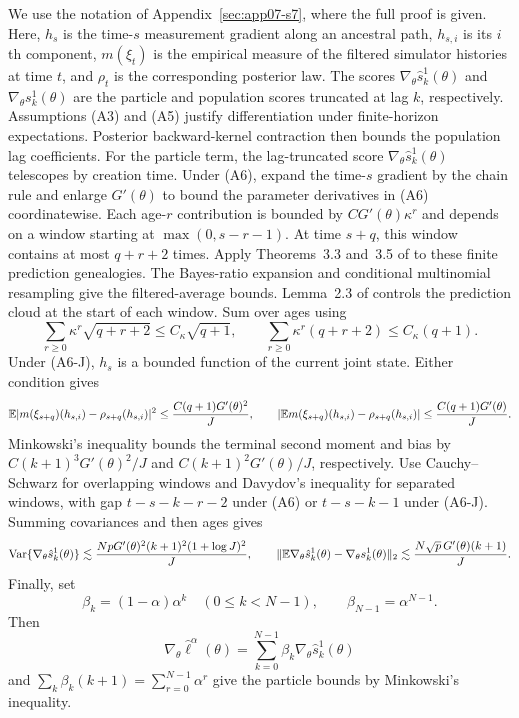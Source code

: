 \begingroup
We use the notation of Appendix~\ref{sec:app07-s7}, where the full proof is given.
Here, $h_s$ is the time-$s$ measurement
gradient along an ancestral path, $h_{s,i}$ is its $i$th component,
$m(\xi_t)$ is the empirical measure of the filtered simulator histories
at time $t$, and $\rho_t$ is the corresponding posterior law.
The scores $\nabla_\theta\hat s_k^1(\theta)$ and
$\nabla_\theta s_k^1(\theta)$ are the particle and population scores
truncated at lag $k$, respectively.
Assumptions (A3) and (A5) justify differentiation under finite-horizon
expectations. Posterior backward-kernel contraction then bounds the
population lag coefficients.
For the particle term, the lag-truncated score
$\nabla_\theta\hat s_k^1(\theta)$ telescopes by creation time.
Under (A6), expand the time-$s$ gradient by the chain rule and enlarge
$G'(\theta)$ to bound the parameter derivatives in (A6) coordinatewise.
Each age-$r$ contribution is bounded by $CG'(\theta)\kappa^r$ and depends
on a window starting at $\max(0,s-r-1)$. At time $s+q$, this window
contains at most $q+r+2$ times. Apply Theorems~3.3 and~3.5 of
\citet{chanDelMoral18} to these finite prediction genealogies.
The Bayes-ratio expansion and conditional multinomial resampling give the
filtered-average bounds. Lemma~2.3 of \citet{karjalainen23} controls the
prediction cloud at the start of each window. Sum over ages using
\[
\sum_{r\geq0}\kappa^r\sqrt{q+r+2}\leq C_\kappa\sqrt{q+1},
\qquad
\sum_{r\geq0}\kappa^r(q+r+2)\leq C_\kappa(q+1).
\]
Under (A6-J), $h_s$ is a bounded function of the current joint state.
Either condition gives
\[
\mathbb{E}|m(\xi_{s+q})(h_{s,i})-\rho_{s+q}(h_{s,i})|^2
\leq \frac{C(q+1)G'(\theta)^2}{J},
\qquad
|\mathbb{E} m(\xi_{s+q})(h_{s,i})-\rho_{s+q}(h_{s,i})|
\leq \frac{C(q+1)G'(\theta)}{J}.
\]
Minkowski's inequality bounds the terminal second moment and bias by
$C(k+1)^3G'(\theta)^2/J$ and $C(k+1)^2G'(\theta)/J$,
respectively. Use Cauchy--Schwarz for overlapping windows and Davydov's
inequality for separated windows, with gap $t-s-k-r-2$ under (A6) or
$t-s-k-1$ under (A6-J). Summing covariances and then ages gives
\[
\mathrm{Var}\{\nabla_\theta\hat s_k^1(\theta)\}
\lesssim\frac{NpG'(\theta)^2(k+1)^2(1+\log J)^2}{J},
\qquad
\|\mathbb{E}\nabla_\theta\hat s_k^1(\theta)
-\nabla_\theta s_k^1(\theta)\|_2
\lesssim\frac{N\sqrt p\,G'(\theta)(k+1)}{J}.
\]
Finally, set
\[
\beta_k=(1-\alpha)\alpha^k\quad(0\leq k<N-1),
\qquad \beta_{N-1}=\alpha^{N-1}.
\]
Then
\[
\nabla_\theta\hat\ell^\alpha(\theta)
=\sum_{k=0}^{N-1}\beta_k\nabla_\theta\hat s_k^1(\theta)
\]
and $\sum_k\beta_k(k+1)=\sum_{r=0}^{N-1}\alpha^r$ give the particle
bounds by Minkowski's inequality.
\par\endgroup


